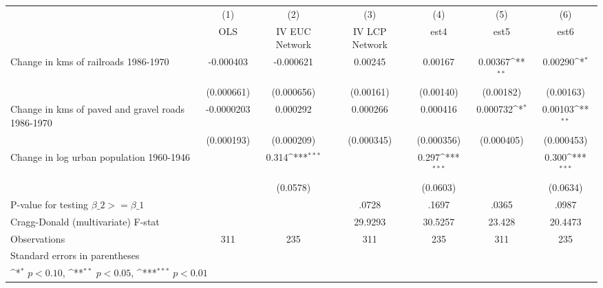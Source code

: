 {
\def\sym#1{\ifmmode^{#1}\else\(^{#1}\)\fi}
\begin{tabular}{l*{6}{c}}
\hline\hline
                &\multicolumn{1}{c}{(1)}&\multicolumn{1}{c}{(2)}&\multicolumn{1}{c}{(3)}&\multicolumn{1}{c}{(4)}&\multicolumn{1}{c}{(5)}&\multicolumn{1}{c}{(6)}\\
                &\multicolumn{1}{c}{OLS}&\multicolumn{1}{c}{IV EUC Network}&\multicolumn{1}{c}{IV LCP Network}&\multicolumn{1}{c}{est4}&\multicolumn{1}{c}{est5}&\multicolumn{1}{c}{est6}\\
\hline
Change in kms of railroads 1986-1970&-0.000403         &-0.000621         &  0.00245         &  0.00167         &  0.00367\sym{**} &  0.00290\sym{*}  \\
                &(0.000661)         &(0.000656)         &(0.00161)         &(0.00140)         &(0.00182)         &(0.00163)         \\
[1em]
Change in kms of paved and gravel roads 1986-1970&-0.0000203         & 0.000292         & 0.000266         & 0.000416         & 0.000732\sym{*}  &  0.00103\sym{**} \\
                &(0.000193)         &(0.000209)         &(0.000345)         &(0.000356)         &(0.000405)         &(0.000453)         \\
[1em]
Change in log urban population 1960-1946&                  &    0.314\sym{***}&                  &    0.297\sym{***}&                  &    0.300\sym{***}\\
                &                  & (0.0578)         &                  & (0.0603)         &                  & (0.0634)         \\
\hline
P-value for testing $\beta\_{2} >= \beta\_{1}$&                  &                  &    .0728         &    .1697         &    .0365         &    .0987         \\
Cragg-Donald (multivariate) F-stat&                  &                  &  29.9293         &  30.5257         &   23.428         &  20.4473         \\
Observations    &      311         &      235         &      311         &      235         &      311         &      235         \\
\hline\hline
\multicolumn{7}{l}{\footnotesize Standard errors in parentheses}\\
\multicolumn{7}{l}{\footnotesize \sym{*} \(p<0.10\), \sym{**} \(p<0.05\), \sym{***} \(p<0.01\)}\\
\end{tabular}
}
